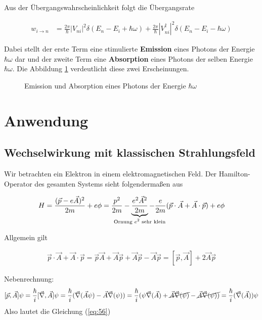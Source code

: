 Aus der Übergangswahrscheinlichkeit folgt die Übergangsrate

\begin{align}
  \label{eq:53}
  w_{i\rightarrow n} &= \frac{2\pi}{\hbar}|V_{ni}|^2 \delta(E_n - E_i + \hbar\omega ) + \frac{2\pi}{\hbar}|V_{ni}^\dagger|^2 \delta(E_n - E_i - \hbar\omega)
\end{align}

Dabei stellt der erste Term eine stimulierte \textbf{Emission} eines Photons der Energie \(\hbar \omega\) dar und der zweite Term eine \textbf{Absorption} eines Photons der selben Energie \(\hbar\omega\). Die Abbildung \ref{fig:3} verdeutlicht diese zwei Erscheinungen.

\begin{figure}[!thb]
  \centering
  
  \caption{Emission und Absorption eines Photons der Energie \(\hbar\omega\)}
 \label{fig:3}
\end{figure}

\section*{Anwendung}
\subsection*{Wechselwirkung mit klassischen Strahlungsfeld}

Wir betrachten ein Elektron in einem elektromagnetischen Feld. Der Hamilton-Operator des gesamten Systems sieht folgendermaßen aus

\begin{align}
  \label{eq:54}
  H = \frac{(\vec p - e\vec A)^2}{2m} + e\phi = \frac{p^2}{2m} - \underbr{\frac{e^2\vec A^2}{2m}}_{\text{Ornung }e^2\text{ sehr klein}} - \frac{e}{2m}( \vec p\cdot \vec A + \vec A \cdot\vec p ) + e\phi
\end{align}

Allgemein gilt

\begin{align}
  \label{eq:56}
  \vec p \cdot\vec A +  \vec A \cdot\vec p = \vec p\vec A + \vec A\vec p + \vec A\vec p - \vec A\vec p = [\vec p,\vec A] + 2\vec A\vec p 
\end{align}

Nebenrechnung:
\begin{align}
  \label{eq:57}
  [\vec p,\vec A]\psi = \frac{\hbar}{i}[\vec\nabla,\vec A]\psi =  \frac{\hbar}{i}(\vec\nabla(\vec A\psi) - \vec A\vec\nabla(\psi)  ) = \frac{\hbar}{i}(\psi \vec\nabla(\vec A)+ \cancel{\vec A \vec\nabla(\psi)} - \cancel{\vec A\vec\nabla(\psi)  )} = \frac{\hbar}{i}( \vec\nabla(\vec A) )\psi
\end{align}
Also lautet die Gleichung (\ref{eq:56})

